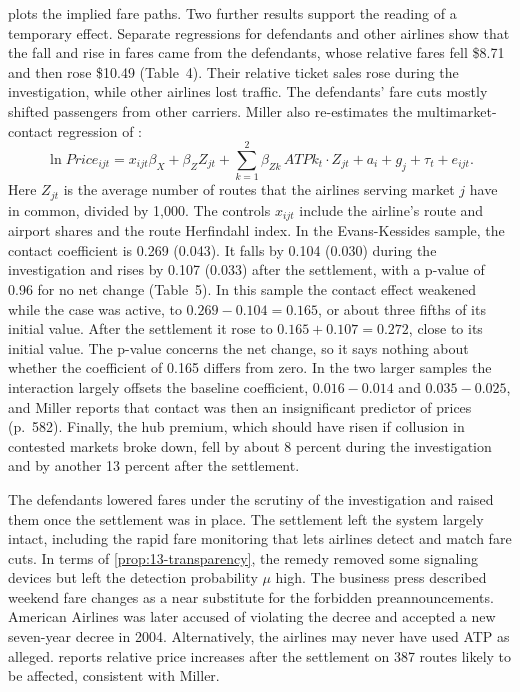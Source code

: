  plots the implied fare paths. Two further results support the reading of a temporary
effect. Separate regressions for defendants and other airlines show that the fall and rise in fares came from the
defendants, whose relative fares fell \$8.71 and then rose \$10.49 (Table~4). Their relative ticket sales rose
during the investigation, while other airlines lost traffic. The defendants' fare cuts mostly shifted passengers
from other carriers. Miller also re-estimates the multimarket-contact regression of \citet{EvansKessides1994}:
\begin{equation}\label{eq:13-miller-mmc}
  \ln \mathit{Price}_{ijt} = x_{ijt}\beta_X + \beta_Z Z_{jt} + \sum_{k=1}^{2}\beta_{Zk}\,\mathit{ATPk}_t\cdot Z_{jt}
    + a_i + g_j + \tau_t + e_{ijt} .
\end{equation}
Here $Z_{jt}$ is the average number of routes that the airlines serving market $j$ have in common, divided by
1,000. The controls $x_{ijt}$ include the airline's route and airport shares and the route Herfindahl index. In the
Evans-Kessides sample, the contact coefficient is 0.269 (0.043). It falls by 0.104 (0.030) during the
investigation and rises by 0.107 (0.033) after the settlement, with a p-value of 0.96 for no net change
(Table~5). In this sample the contact effect weakened while the case was active, to $0.269 - 0.104 = 0.165$, or
about three fifths of its initial value. After the settlement it rose to $0.165 + 0.107 = 0.272$, close to its
initial value. The p-value concerns the net change,
so it says nothing about whether the coefficient of 0.165 differs from zero. In the two larger samples the
interaction largely offsets the baseline coefficient, $0.016 - 0.014$ and $0.035 - 0.025$, and Miller reports that
contact was then an insignificant predictor of prices (p.~582). Finally, the hub premium,
which should have risen if collusion in contested markets broke down, fell by about 8 percent during the
investigation and by another 13 percent after the settlement.

The defendants lowered fares under the scrutiny of the investigation and raised them once the settlement was in
place. The settlement left the system largely intact, including the rapid fare monitoring that lets airlines
detect and match fare cuts. In terms of \cref{prop:13-transparency}, the remedy removed some signaling devices but
left the detection probability $\mu$ high. The business press described weekend fare changes as a near substitute
for the forbidden preannouncements. American Airlines was later accused of violating the decree and accepted a
new seven-year decree in 2004. Alternatively, the airlines may never have used ATP as alleged.
\citet{Borenstein2004} reports relative price increases after the settlement on 387 routes likely to be affected,
consistent with Miller.

